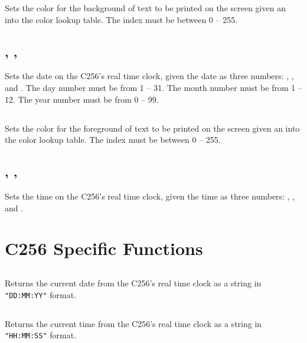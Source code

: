 \documentclass{article}
\begin{document}
    Sets the color for the background of text to be printed on the screen given
    an  into the color lookup table.
    The index must be between 0 -- 255.    

    \subsection{ , , }

    Sets the date on the C256's real time clock, given the date as three numbers:
    , , and .
    The day number must be from 1 -- 31.
    The month number must be from 1 -- 12.
    The year number must be from 0 -- 99.

    \subsection{ }

    Sets the color for the foreground of text to be printed on the screen given
    an  into the color lookup table.
    The index must be between 0 -- 255.    

    \subsection{ , , }

    Sets the time on the C256's real time clock, given the time as three numbers:
    , , and .

    \section{C256 Specific Functions}

    \subsection{}

    Returns the current date from the C256's real time clock as a string
    in \verb+"DD:MM:YY"+ format.

    \subsection{}

    Returns the current time from the C256's real time clock as a string
    in \verb+"HH:MM:SS"+ format.    
\end{document}
